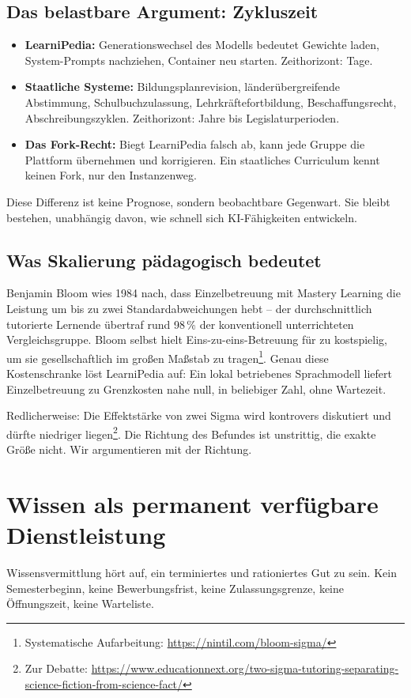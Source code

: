 \documentclass[11pt,a4paper]{article}
\begin{document}
\subsection{Das belastbare Argument: Zykluszeit}
\begin{itemize}[label=--]
    \item \textbf{LearniPedia:} Generationswechsel des Modells bedeutet Gewichte laden, System-Prompts nachziehen, Container neu starten. Zeithorizont: Tage.
    \item \textbf{Staatliche Systeme:} Bildungsplanrevision, länderübergreifende Abstimmung, Schulbuchzulassung, Lehrkräftefortbildung, Beschaffungsrecht, Abschreibungszyklen. Zeithorizont: Jahre bis Legislaturperioden.
    \item \textbf{Das Fork-Recht:} Biegt LearniPedia falsch ab, kann jede Gruppe die Plattform übernehmen und korrigieren. Ein staatliches Curriculum kennt keinen Fork, nur den Instanzenweg.
\end{itemize}
\noindent Diese Differenz ist keine Prognose, sondern beobachtbare Gegenwart. Sie bleibt bestehen, unabhängig davon, wie schnell sich KI-Fähigkeiten entwickeln.

\subsection{Was Skalierung pädagogisch bedeutet}
Benjamin Bloom wies 1984 nach, dass Einzelbetreuung mit Mastery Learning die Leistung um bis zu zwei Standardabweichungen hebt -- der durchschnittlich tutorierte Lernende übertraf rund 98\,\% der konventionell unterrichteten Vergleichsgruppe. Bloom selbst hielt Eins-zu-eins-Betreuung für zu kostspielig, um sie gesellschaftlich im großen Maßstab zu tragen\footnote{Systematische Aufarbeitung: \url{https://nintil.com/bloom-sigma/}}. Genau diese Kostenschranke löst LearniPedia auf: Ein lokal betriebenes Sprachmodell liefert Einzelbetreuung zu Grenzkosten nahe null, in beliebiger Zahl, ohne Wartezeit.

Redlicherweise: Die Effektstärke von zwei Sigma wird kontrovers diskutiert und dürfte niedriger liegen\footnote{Zur Debatte: \url{https://www.educationnext.org/two-sigma-tutoring-separating-science-fiction-from-science-fact/}}. Die Richtung des Befundes ist unstrittig, die exakte Größe nicht. Wir argumentieren mit der Richtung.

\section{Wissen als permanent verfügbare Dienstleistung}
Wissensvermittlung hört auf, ein terminiertes und rationiertes Gut zu sein. Kein Semesterbeginn, keine Bewerbungsfrist, keine Zulassungsgrenze, keine Öffnungszeit, keine Warteliste.
\end{document}
